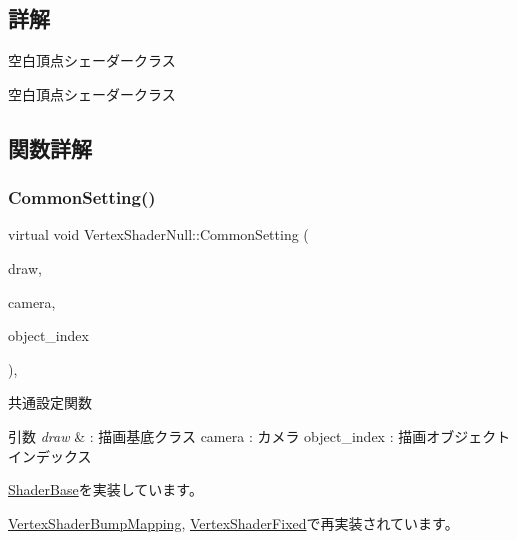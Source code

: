 \subsection{詳解}
空白頂点シェーダークラス 

空白頂点シェーダークラス 

\subsection{関数詳解}
\mbox{\label{class_vertex_shader_null_a95f1a66045fb39c42cf0566f1990b6a1}} 
\subsubsection{\texorpdfstring{Common\+Setting()}{CommonSetting()}}
{\footnotesize\ttfamily virtual void Vertex\+Shader\+Null\+::\+Common\+Setting (\begin{DoxyParamCaption}\item[{\mbox{\hyperlink{class_draw_base}{Draw\+Base}} $\ast$}]{draw,  }\item[{\mbox{\hyperlink{class_camera}{Camera}} $\ast$}]{camera,  }\item[{unsigned}]{object\+\_\+index }\end{DoxyParamCaption})\hspace{0.3cm}{\ttfamily [inline]}, {\ttfamily [virtual]}}



共通設定関数 


\begin{DoxyParams}{引数}
{\em draw} & \+: 描画基底クラス camera \+: カメラ object\+\_\+index \+: 描画オブジェクトインデックス \\
\hline
\end{DoxyParams}


\mbox{\hyperlink{class_shader_base_aef6fa922223d71fbec81464ebbfaf687}{Shader\+Base}}を実装しています。



\mbox{\hyperlink{class_vertex_shader_bump_mapping_a7979584d035fff86d386c99617a8dd2c}{Vertex\+Shader\+Bump\+Mapping}}, \mbox{\hyperlink{class_vertex_shader_fixed_a82bf2829b6fd0df26faedcbf650ba08d}{Vertex\+Shader\+Fixed}}で再実装されています。

\mbox{\label{class_vertex_shader_null_af30eb8057fe0537bc6ade214647b6fb5}} 
